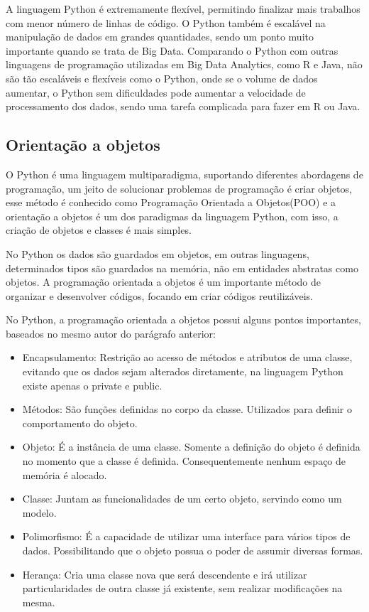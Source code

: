         A linguagem Python é extremamente flexível, permitindo finalizar mais trabalhos com menor número de linhas de código. O Python também é escalável na manipulação de dados em grandes quantidades, sendo um ponto muito importante quando se trata de Big Data. Comparando o Python com outras linguagens de programação utilizadas em Big Data Analytics, como R e Java, não são tão escaláveis e flexíveis como o Python, onde se o volume de dados aumentar, o Python sem dificuldades pode aumentar a velocidade de processamento dos dados, sendo uma tarefa complicada para fazer em R ou Java. \cite{McKinney2019}

        \subsection{Orientação a objetos}  
        O Python é uma linguagem multiparadigma, suportando diferentes abordagens de programação, um jeito de solucionar problemas de programação é criar objetos, esse método é conhecido como Programação Orientada a Objetos(POO) e a orientação a objetos é um dos paradigmas da linguagem Python, com isso, a criação de objetos e classes é mais simples. 
        
        No Python os dados são guardados em objetos, em outras linguagens, determinados tipos são guardados na memória, não em entidades abstratas como objetos. A programação orientada a objetos é um importante método de organizar e desenvolver códigos, focando em criar códigos reutilizáveis. \cite{Lutz2007}
        
        No Python, a programação orientada a objetos possui alguns pontos importantes, baseados no mesmo autor do parágrafo anterior: 
        \begin{itemize}
        	\item Encapsulamento: Restrição ao acesso de métodos e atributos de uma classe, evitando que os dados sejam alterados diretamente, na linguagem Python existe apenas o private e public.
        	
        	\item Métodos: São funções definidas no corpo da classe. Utilizados para definir o comportamento do objeto. 
        	
        	\item Objeto: É a instância de uma classe. Somente a definição do objeto é definida no momento que a classe é definida.  Consequentemente nenhum espaço de memória é alocado.
        	
        	\item Classe: Juntam as funcionalidades de um certo objeto, servindo como um modelo.
        	
        	\item Polimorfismo: É a capacidade de utilizar uma interface para vários tipos de dados. Possibilitando que o objeto possua o poder de assumir diversas formas. 
        	
        	\item Herança: Cria uma classe nova que será descendente e irá utilizar particularidades de outra classe já existente, sem realizar modificações na mesma.
        	 
        	
        \end{itemize}


